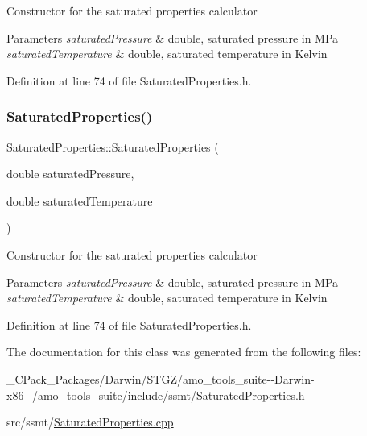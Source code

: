 Constructor for the saturated properties calculator 
\begin{DoxyParams}{Parameters}
{\em saturated\+Pressure} & double, saturated pressure in M\+Pa \\
\hline
{\em saturated\+Temperature} & double, saturated temperature in Kelvin \\
\hline
\end{DoxyParams}


Definition at line 74 of file Saturated\+Properties.\+h.

\mbox{\label{class_saturated_properties_a83cc16d024ff9bd7ac586df9e946a062}} 
\subsubsection{\texorpdfstring{Saturated\+Properties()}{SaturatedProperties()}\hspace{0.1cm}{\footnotesize\ttfamily [3/3]}}
{\footnotesize\ttfamily Saturated\+Properties\+::\+Saturated\+Properties (\begin{DoxyParamCaption}\item[{double}]{saturated\+Pressure,  }\item[{double}]{saturated\+Temperature }\end{DoxyParamCaption})\hspace{0.3cm}{\ttfamily [inline]}}

Constructor for the saturated properties calculator 
\begin{DoxyParams}{Parameters}
{\em saturated\+Pressure} & double, saturated pressure in M\+Pa \\
\hline
{\em saturated\+Temperature} & double, saturated temperature in Kelvin \\
\hline
\end{DoxyParams}


Definition at line 74 of file Saturated\+Properties.\+h.



The documentation for this class was generated from the following files\+:\begin{DoxyCompactItemize}
\item 
\+\_\+\+C\+Pack\+\_\+\+Packages/\+Darwin/\+S\+T\+G\+Z/amo\+\_\+tools\+\_\+suite-\/-\/\+Darwin-\/x86\+\_/amo\+\_\+tools\+\_\+suite/include/ssmt/\hyperlink{___c_pack___packages_2_darwin_2_s_t_g_z_2amo__tools__suite--_darwin-x86__64_2amo__tools__suite_2b97ccf799ea6561aa4d6a618c8073459}{Saturated\+Properties.\+h}\item 
src/ssmt/\hyperlink{_saturated_properties_8cpp}{Saturated\+Properties.\+cpp}\end{DoxyCompactItemize}
